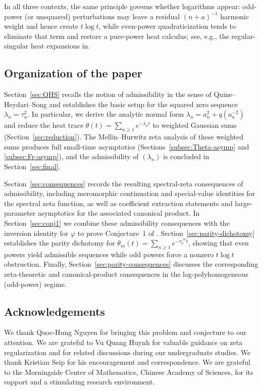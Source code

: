 \documentclass[11pt,letterpaper]{amsart}
\numberwithin{equation}{section}
\theoremstyle{definition}
\begin{document}
\noindent
In all three contexts, the same principle governs whether logarithms appear: odd-power (or unsquared) perturbations may leave a residual $(n+a)^{-1}$ harmonic weight and hence
create $t\log t$, while even-power quadraticization tends to eliminate that term and restore a pure-power
heat calculus; see, e.g., the regular-singular heat expansions in\cite{BruningSeeley1985_RegularSingularAsymptotics,BruningSeeley1987_ResolventExpansion}.




\subsection*{Organization of the paper}

Section~\ref{sec:QHS} recalls the notion of admissibility in the sense of Quine--Heydari--Song and establishes the basic setup for the squared zero sequence $\lambda_n=\tau_n^2$.  In particular, we derive the analytic normal form $\lambda_n=a_n^2+q(a_n^{-2})$ and reduce the heat trace $\theta(t)=\sum_{n\ge1}e^{-\lambda_n t}$ to weighted Gaussian sums (Section~\ref{sec:reduction}).  The Mellin--Hurwitz zeta analysis of these weighted sums produces full small-time asymptotics (Sections~\ref{subsec:Theta-asymp} and \ref{subsec:Fr-asymp}), and the admissibility of $(\lambda_n)$ is concluded in Section~\ref{sec:final}.

Section~\ref{sec:consequences} records the resulting spectral-zeta consequences of admissibility, including meromorphic continuation and special-value identities for the spectral zeta function, as well as coefficient extraction statements and large-parameter asymptotics for the associated canonical product.  In Section~\ref{sec:conj1} we combine these admissibility consequences with the inversion identity for $\varphi$ to prove Conjecture~1 of \cite{BOCRS}.  Section~\ref{sec:parity-dichotomy} establishes the parity dichotomy for $\theta_m(t)=\sum_{n\ge1}e^{-\tau_n^{,m}t}$, showing that even powers yield admissible sequences while odd powers force a nonzero $t\log t$ obstruction.  Finally, Section~\ref{sec:parity-consequences} discusses the corresponding zeta-theoretic and canonical-product consequences in the log-polyhomogeneous (odd-power) regime.

\subsection*{Acknowledgements}

We thank Quoc-Hung Nguyen for bringing this problem and conjecture to our attention. We are grateful to Vu Quang Huynh for valuable guidance on zeta regularization and for related discussions during our undergraduate studies. We thank Kristian Seip for his encouragement and correspondence. We are grateful to the Morningside Center of Mathematics, Chinese Academy of Sciences, for its support and a stimulating research environment.
\end{document}
